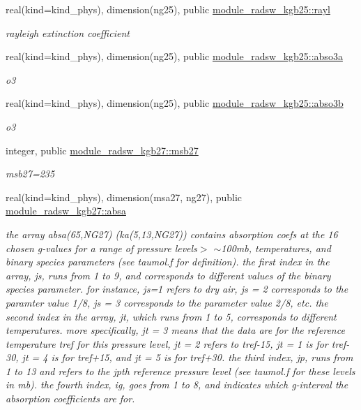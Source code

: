 \begin{Indent}
\begin{DoxyCompactItemize}
real(kind=kind\+\_\+phys), dimension(ng25), public \hyperlink{group__module__radsw__kgbnn_ga3d32a0d74d03129cacd9c4bb2e58683a}{module\+\_\+radsw\+\_\+kgb25\+::rayl}
\begin{DoxyCompactList}\small\item\em rayleigh extinction coefficient \end{DoxyCompactList}\item 
real(kind=kind\+\_\+phys), dimension(ng25), public \hyperlink{group__module__radsw__kgbnn_gab02765dac8ca71a439cdaf1ed2691851}{module\+\_\+radsw\+\_\+kgb25\+::abso3a}
\begin{DoxyCompactList}\small\item\em o3 \end{DoxyCompactList}\item 
real(kind=kind\+\_\+phys), dimension(ng25), public \hyperlink{group__module__radsw__kgbnn_ga2844cade392c8805b1d418bc1260b3a5}{module\+\_\+radsw\+\_\+kgb25\+::abso3b}
\begin{DoxyCompactList}\small\item\em o3 \end{DoxyCompactList}\item 
integer, public \hyperlink{group__module__radsw__kgbnn_ga3b2e57a0d4596aead5cad5aaca74850d}{module\+\_\+radsw\+\_\+kgb27\+::msb27}
\begin{DoxyCompactList}\small\item\em msb27=235 \end{DoxyCompactList}\item 
real(kind=kind\+\_\+phys), dimension(msa27, ng27), public \hyperlink{group__module__radsw__kgbnn_gaaf6ba2ea0beacba67c045a10d7a6a782}{module\+\_\+radsw\+\_\+kgb27\+::absa}
\begin{DoxyCompactList}\small\item\em the array absa(65,\+N\+G27) (ka(5,13,\+N\+G27)) contains absorption coefs at the 16 chosen g-\/values for a range of pressure levels$>$ $\sim$100mb, temperatures, and binary species parameters (see taumol.\+f for definition). the first index in the array, js, runs from 1 to 9, and corresponds to different values of the binary species parameter. for instance, js=1 refers to dry air, js = 2 corresponds to the paramter value 1/8, js = 3 corresponds to the parameter value 2/8, etc. the second index in the array, jt, which runs from 1 to 5, corresponds to different temperatures. more specifically, jt = 3 means that the data are for the reference temperature tref for this pressure level, jt = 2 refers to tref-\/15, jt = 1 is for tref-\/30, jt = 4 is for tref+15, and jt = 5 is for tref+30. the third index, jp, runs from 1 to 13 and refers to the jpth reference pressure level (see taumol.\+f for these levels in mb). the fourth index, ig, goes from 1 to 8, and indicates which g-\/interval the absorption coefficients are for. \end{DoxyCompactList}\item 

\end{DoxyCompactItemize}
\end{Indent}
